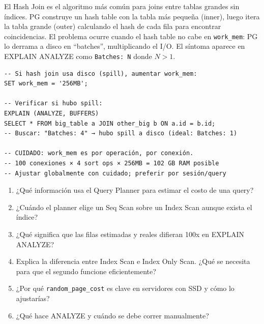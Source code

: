 El Hash Join es el algoritmo más común para joins entre tablas grandes sin índices.
PG construye un hash table con la tabla más pequeña (inner), luego itera la tabla grande (outer) calculando el hash de cada fila para encontrar coincidencias.
El problema ocurre cuando el hash table no cabe en \texttt{work\_mem}: PG lo derrama a disco en ``batches'', multiplicando el I/O.
El síntoma aparece en EXPLAIN ANALYZE como \texttt{Batches: N} donde $N > 1$.

\begin{lstlisting}[caption={work\_mem y Hash Join}]
-- Si hash join usa disco (spill), aumentar work_mem:
SET work_mem = '256MB';

-- Verificar si hubo spill:
EXPLAIN (ANALYZE, BUFFERS)
SELECT * FROM big_table a JOIN other_big b ON a.id = b.id;
-- Buscar: "Batches: 4" → hubo spill a disco (ideal: Batches: 1)

-- CUIDADO: work_mem es por operación, por conexión.
-- 100 conexiones × 4 sort ops × 256MB = 102 GB RAM posible
-- Ajustar globalmente con cuidado; preferir por sesión/query
\end{lstlisting}

\begin{entrevistabox}
\begin{enumerate}
  \item ¿Qué información usa el Query Planner para estimar el costo de una query?
  \item ¿Cuándo el planner elige un Seq Scan sobre un Index Scan aunque exista el índice?
  \item ¿Qué significa que las filas estimadas y reales difieran 100x en EXPLAIN ANALYZE?
  \item Explica la diferencia entre Index Scan e Index Only Scan. ¿Qué se necesita para que el segundo funcione eficientemente?
  \item ¿Por qué \texttt{random\_page\_cost} es clave en servidores con SSD y cómo lo ajustarías?
  \item ¿Qué hace ANALYZE y cuándo se debe correr manualmente?
\end{enumerate}
\end{entrevistabox}
